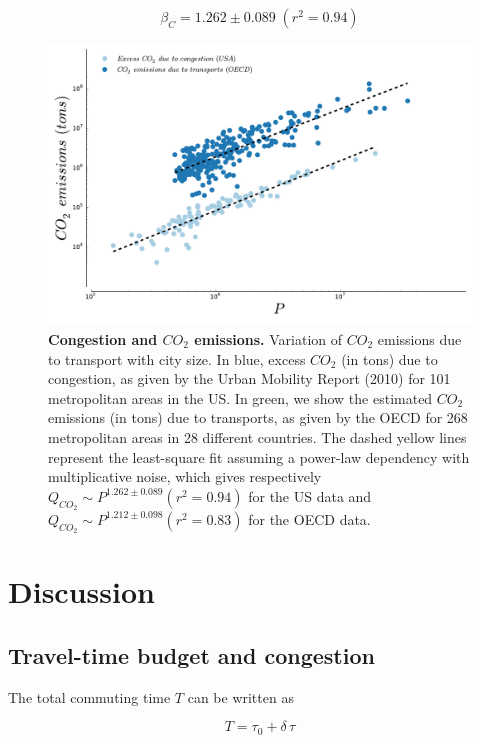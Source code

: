 \begin{equation}
    \boxed{\beta_C = 1.262 \pm 0.089\;(r^2=0.94)}
\end{equation}

\begin{figure}
    \includegraphics[width=0.9\linewidth]{gfx/chapter-scaling/scaling_co2.pdf}
    \caption{{\bf Congestion and $CO_2$ emissions.} Variation of $CO_2$
emissions due to transport with city size. In blue, excess $CO_2$ (in tons) due
to congestion, as given by the Urban Mobility Report (2010) for 101 metropolitan
areas in the US. In green, we show the estimated $CO_2$
emissions (in tons) due to transports, as given by the OECD for 268 metropolitan
areas in 28 different countries. The dashed yellow lines represent the least-square fit
assuming a power-law dependency with multiplicative noise, which gives
respectively $Q_{CO_2} \sim P^{1.262 \pm 0.089} (r^2=0.94)$ for the US data and
$Q_{CO_2} \sim P^{1.212 \pm 0.098} (r^2=0.83)$ for the OECD data.
\label{fig:scaling_co2}} 
\end{figure}



\section{Discussion}

\subsection{Travel-time budget and congestion}

The total commuting time $T$ can be written as

\begin{equation}
    T = \tau_0 + \delta\,\tau
\end{equation}

